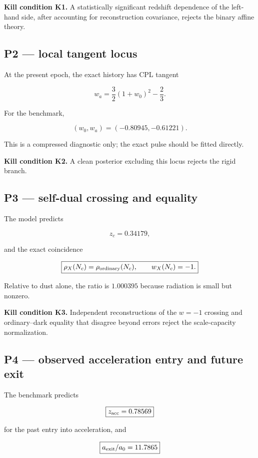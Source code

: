 \documentclass[
  11pt,
  letterpaper,
]{article}
\begin{document}
\textbf{Kill condition K1.} A statistically significant redshift
dependence of the left-hand side, after accounting for reconstruction
covariance, rejects the binary affine theory.

\subsection{P2 --- local tangent locus}\label{p2-local-tangent-locus}

At the present epoch, the exact history has CPL tangent

\[
\boxed{
w_a=\frac32(1+w_0)^2-\frac23.
}
\]

For the benchmark,

\[
(w_0,w_a)=(-0.80945,-0.61221).
\]

This is a compressed diagnostic only; the exact pulse should be fitted
directly.

\textbf{Kill condition K2.} A clean posterior excluding this locus
rejects the rigid branch.

\subsection{P3 --- self-dual crossing and
equality}\label{p3-self-dual-crossing-and-equality}

The model predicts

\[
\boxed{
z_c=0.34179,}
\]

and the exact coincidence

\[
\boxed{
\rho_X(N_c)=\rho_{\rm ordinary}(N_c),
\qquad
w_X(N_c)=-1.
}
\]

Relative to dust alone, the ratio is \(1.000395\) because radiation is
small but nonzero.

\textbf{Kill condition K3.} Independent reconstructions of the \(w=-1\)
crossing and ordinary--dark equality that disagree beyond errors reject
the scale-capacity normalization.

\subsection{P4 --- observed acceleration entry and future
exit}\label{p4-observed-acceleration-entry-and-future-exit}

The benchmark predicts

\[
\boxed{z_{\rm acc}=0.78569}
\]

for the past entry into acceleration, and

\[
\boxed{a_{\rm exit}/a_0=11.7865}
\]
\end{document}
